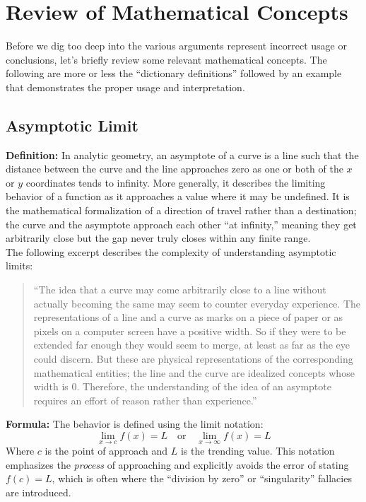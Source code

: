 \documentclass[twoside,twocolumn,9pt]{article}
\begin{document}
\section{Review of Mathematical Concepts}
Before we dig too deep into the various arguments represent incorrect usage or conclusions, let's briefly review some relevant mathematical concepts. The following are more or less the ``dictionary definitions'' followed by an example that demonstrates the proper usage and interpretation.

\subsection{Asymptotic Limit}
\textbf{Definition:}
In analytic geometry, an asymptote of a curve is a line such that the distance between the curve and the line approaches zero as one or both of the $x$ or $y$ coordinates tends to infinity. More generally, it describes the limiting behavior of a function as it approaches a value where it may be undefined. It is the mathematical formalization of a direction of travel rather than a destination; the curve and the asymptote approach each other ``at infinity,'' meaning they get arbitrarily close but the gap never truly closes within any finite range.\\

The following excerpt describes the complexity of understanding asymptotic limits:

\begin{quote}
``The idea that a curve may come arbitrarily close to a line without actually becoming the same may seem to counter everyday experience. The representations of a line and a curve as marks on a piece of paper or as pixels on a computer screen have a positive width. So if they were to be extended far enough they would seem to merge, at least as far as the eye could discern. But these are physical representations of the corresponding mathematical entities; the line and the curve are idealized concepts whose width is 0. Therefore, the understanding of the idea of an asymptote requires an effort of reason rather than experience.''\cite{wikipedia_asymptote}
\end{quote}

\noindent\textbf{Formula:}
The behavior is defined using the limit notation:
\begin{equation}
\lim_{x \to c} f(x) = L \quad \text{or} \quad \lim_{x \to \infty} f(x) = L
\end{equation}
Where $c$ is the point of approach and $L$ is the trending value. This notation emphasizes the \textit{process} of approaching and explicitly avoids the error of stating $f(c) = L$, which is often where the ``division by zero'' or ``singularity'' fallacies are introduced.\\
\end{document}
